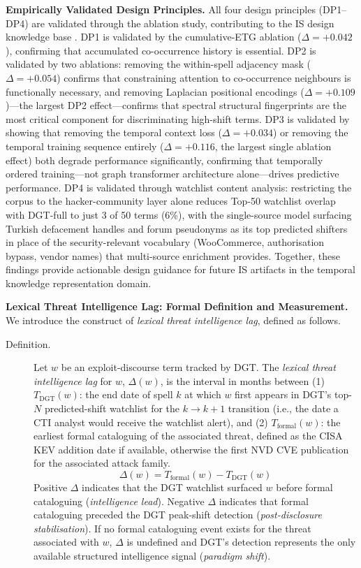 \documentclass[12pt]{article}
\begin{document}
\textbf{Empirically Validated Design Principles.} All four design principles (DP1--DP4) are validated through the ablation study, contributing to the IS design knowledge base \parencite{gregor2013}. DP1 is validated by the cumulative-ETG ablation ($\Delta = +0.042$), confirming that accumulated co-occurrence history is essential. DP2 is validated by two ablations: removing the within-spell adjacency mask ($\Delta = +0.054$) confirms that constraining attention to co-occurrence neighbours is functionally necessary, and removing Laplacian positional encodings ($\Delta = +0.109$)---the largest DP2 effect---confirms that spectral structural fingerprints are the most critical component for discriminating high-shift terms. DP3 is validated by showing that removing the temporal context loss ($\Delta = +0.034$) or removing the temporal training sequence entirely ($\Delta = +0.116$, the largest single ablation effect) both degrade performance significantly, confirming that temporally ordered training---not graph transformer architecture alone---drives predictive performance. DP4 is validated through watchlist content analysis: restricting the corpus to the hacker-community layer alone reduces Top-50 watchlist overlap with DGT-full to just 3 of 50 terms (6\%), with the single-source model surfacing Turkish defacement handles and forum pseudonyms as its top predicted shifters in place of the security-relevant vocabulary (WooCommerce, authorisation bypass, vendor names) that multi-source enrichment provides. Together, these findings provide actionable design guidance for future IS artifacts in the temporal knowledge representation domain.

\textbf{Lexical Threat Intelligence Lag: Formal Definition and Measurement.} We introduce the construct of \textit{lexical threat intelligence lag}, defined as follows.

\begin{description}
\item[Definition.] Let $w$ be an exploit-discourse term tracked by DGT. The \textit{lexical threat intelligence lag} for $w$, $\Delta(w)$, is the interval in months between (1) $T_{\mathrm{DGT}}(w)$: the end date of spell $k$ at which $w$ first appears in DGT's top-$N$ predicted-shift watchlist for the $k \to k{+}1$ transition (i.e., the date a CTI analyst would receive the watchlist alert), and (2) $T_{\mathrm{formal}}(w)$: the earliest formal cataloguing of the associated threat, defined as the CISA KEV addition date if available, otherwise the first NVD CVE publication for the associated attack family.
\[
  \Delta(w) = T_{\mathrm{formal}}(w) - T_{\mathrm{DGT}}(w)
\]
Positive $\Delta$ indicates that the DGT watchlist surfaced $w$ before formal cataloguing (\textit{intelligence lead}). Negative $\Delta$ indicates that formal cataloguing preceded the DGT peak-shift detection (\textit{post-disclosure stabilisation}). If no formal cataloguing event exists for the threat associated with $w$, $\Delta$ is undefined and DGT's detection represents the only available structured intelligence signal (\textit{paradigm shift}).
\end{description}
\end{document}
